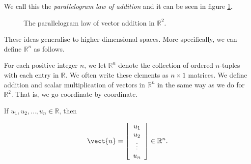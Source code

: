 We call this the \textit{parallelogram law of addition }and it can be seen in figure \ref{fig:parallelogram-law}.

\begin{figure}[htbp]
    \centering
    \caption{The parallelogram law of vector addition in $\mathbb{R}^2$.}
    \label{fig:parallelogram-law}
\end{figure}

These ideas generalise to higher-dimensional spaces. More specifically, we can define $\mathbb{R}^n$ as follows.

\begin{definition}
    For each positive integer $n$, we let $\mathbb{R}^n$ denote the collection of ordered $n$-tuples with each entry in $\mathbb{R}$. We often write these elements as $n \times 1$ matrices. We define addition and scalar multiplication of vectors in $\mathbb{R}^n$ in the same way as we do for $\mathbb{R}^2$. That is, we go coordinate-by-coordinate.
\end{definition}

\begin{example}
    If $u_1, u_2, \ldots, u_n \in \mathbb{R}$, then

    \[
    \vect{u} = \left[\begin{array}{c}
    u_1 \\
    u_2 \\
    \vdots \\
    u_n
    \end{array}\right] \in \mathbb{R}^n.
    \]
     
\end{example}

